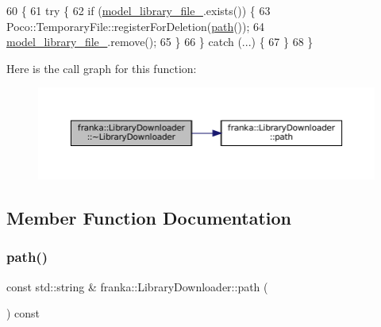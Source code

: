 \begin{DoxyCode}
60                                       \{
61   \textcolor{keywordflow}{try} \{
62     \textcolor{keywordflow}{if} (\hyperlink{classfranka_1_1LibraryDownloader_a40ea4c7b49484ed554b915e4d1df24f7}{model\_library\_file\_}.exists()) \{
63       Poco::TemporaryFile::registerForDeletion(\hyperlink{classfranka_1_1LibraryDownloader_ac33161b97cad34550de02c67f4feb15c}{path}());
64       \hyperlink{classfranka_1_1LibraryDownloader_a40ea4c7b49484ed554b915e4d1df24f7}{model\_library\_file\_}.remove();
65     \}
66   \} \textcolor{keywordflow}{catch} (...) \{
67   \}
68 \}
\end{DoxyCode}
Here is the call graph for this function\+:
\nopagebreak
\begin{figure}[H]
\begin{center}
\leavevmode
\includegraphics[width=350pt]{classfranka_1_1LibraryDownloader_a036c9b6d446b873446a41c6ce3feffbe_cgraph}
\end{center}
\end{figure}


\subsection{Member Function Documentation}
\mbox{\label{classfranka_1_1LibraryDownloader_ac33161b97cad34550de02c67f4feb15c}} 
\subsubsection{\texorpdfstring{path()}{path()}}
{\footnotesize\ttfamily const std\+::string \& franka\+::\+Library\+Downloader\+::path (\begin{DoxyParamCaption}{ }\end{DoxyParamCaption}) const\hspace{0.3cm}{\ttfamily [noexcept]}}



